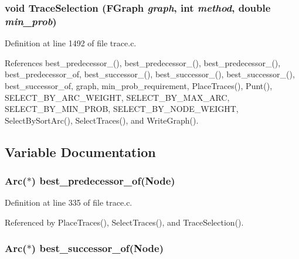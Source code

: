 \subsubsection{\setlength{\rightskip}{0pt plus 5cm}void Trace\-Selection (\bf{FGraph} {\em graph}, int {\em method}, double {\em min\_\-prob})}\label{trace_8c_951defdcd9a7214e202ca16f3eb98b94}




Definition at line 1492 of file trace.c.

References best\_\-predecessor\_(), best\_\-predecessor\_(), best\_\-predecessor\_(), best\_\-predecessor\_\-of, best\_\-successor\_(), best\_\-successor\_(), best\_\-successor\_(), best\_\-successor\_\-of, graph, min\_\-prob\_\-requirement, Place\-Traces(), Punt(), SELECT\_\-BY\_\-ARC\_\-WEIGHT, SELECT\_\-BY\_\-MAX\_\-ARC, SELECT\_\-BY\_\-MIN\_\-PROB, SELECT\_\-BY\_\-NODE\_\-WEIGHT, Select\-By\-Sort\-Arc(), Select\-Traces(), and Write\-Graph().

\subsection{Variable Documentation}
\subsubsection{\setlength{\rightskip}{0pt plus 5cm}\bf{Arc}($\ast$) \bf{best\_\-predecessor\_\-of}(\bf{Node})\hspace{0.3cm}{\tt  [static]}}\label{trace_8c_8374072ee89821082ae2dba5d987d0b5}




Definition at line 335 of file trace.c.

Referenced by Place\-Traces(), Select\-Traces(), and Trace\-Selection().
\subsubsection{\setlength{\rightskip}{0pt plus 5cm}\bf{Arc}($\ast$) \bf{best\_\-successor\_\-of}(\bf{Node})\hspace{0.3cm}{\tt  [static]}}\label{trace_8c_bffc23ab48988d7dc27705079e652705}




